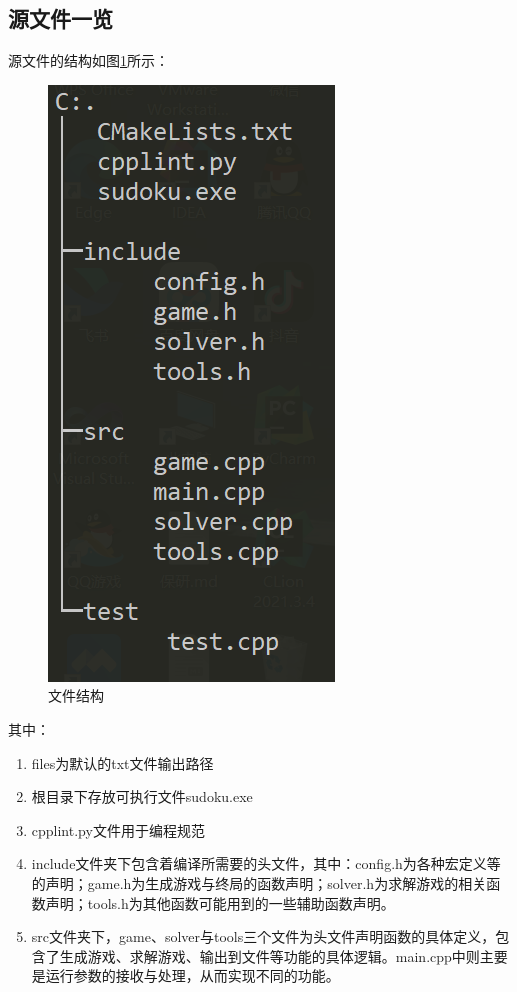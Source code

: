 \documentclass[a4paper]{article}
\begin{document}
\subsection{源文件一览}
源文件的结构如图\ref{fig:tree}所示：
\begin{figure}[!ht]
    \centering
    \includegraphics[scale=0.9]{images/tree.png}
    \caption{文件结构}
    \label{fig:tree}
\end{figure}
\par
其中：
\begin{enumerate}
\item files为默认的txt文件输出路径
\item 根目录下存放可执行文件sudoku.exe
\item cpplint.py文件用于编程规范
\item include文件夹下包含着编译所需要的头文件，其中：config.h为各种宏定义等的声明；game.h为生成游戏与终局的函数声明；solver.h为求解游戏的相关函数声明；tools.h为其他函数可能用到的一些辅助函数声明。
\item src文件夹下，game、solver与tools三个文件为头文件声明函数的具体定义，包含了生成游戏、求解游戏、输出到文件等功能的具体逻辑。main.cpp中则主要是运行参数的接收与处理，从而实现不同的功能。

\end{enumerate}
\end{document}
